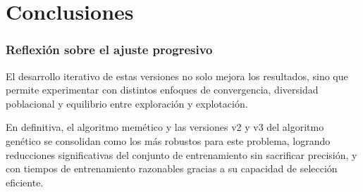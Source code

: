 
\chapter{Conclusiones}\label{ch:conclusiones}

\subsection{Reflexión sobre el ajuste progresivo}\label{sec:reflexion-sobre-el-ajuste-progresivo}
El desarrollo iterativo de estas versiones no solo mejora los resultados, sino que permite experimentar con distintos enfoques de convergencia,
diversidad poblacional y equilibrio entre exploración y explotación.

En definitiva, el algoritmo memético y las versiones v2 y v3 del algoritmo genético se consolidan como los más robustos para este problema,
logrando reducciones significativas del conjunto de entrenamiento sin sacrificar precisión, y con tiempos de entrenamiento razonables gracias
a su capacidad de selección eficiente.